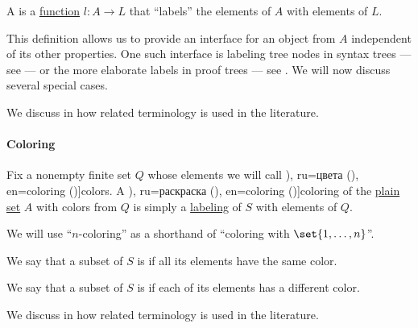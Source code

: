 \begin{definition}\label{def:labeled_set}\mimprovised
  A  is a \hyperref[def:function]{function} \( l: A \to L \) that \enquote{labels} the elements of \( A \) with elements of \( L \).
\end{definition}
\begin{comments}
  \item This definition allows us to provide an interface for an object from \( A \) independent of its other properties. One such interface is labeling tree nodes in syntax trees --- see  --- or the more elaborate labels in proof trees --- see . We will now discuss several special cases.

  \item We discuss in  how related terminology is used in the literature.
\end{comments}

\paragraph{Coloring}

\begin{definition}\label{def:set_coloring}\mimprovised
  Fix a nonempty finite set \( Q \) whose elements we will call \term[bg=цветове (\cite[141]{Мирчев2001}), ru=цвета (\cite[\S 10.7.1]{Новиков2013}), en=coloring (\cite[111]{Diestel2005})]{colors}. A \term[bg=оцветяване (\cite[141]{Мирчев2001}), ru=раскраска (\cite[\S 10.7.1]{Новиков2013}), en=coloring (\cite[111]{Diestel2005})]{coloring} of the \hyperref[def:plain_set]{plain set} \( A \) with colors from \( Q \) is simply a \hyperref[def:labeled_set]{labeling} of \( S \) with elements of \( Q \).

  We will use \enquote{\( n \)-coloring} as a shorthand of \enquote{coloring with \( \set{ 1, \ldots, n } \)}.

  \begin{thmenum}
     We say that a subset of \( S \) is  if all its elements have the same color.

     We say that a subset of \( S \) is  if each of its elements has a different color.
  \end{thmenum}
\end{definition}
\begin{comments}
  \item We discuss in  how related terminology is used in the literature.
\end{comments}

